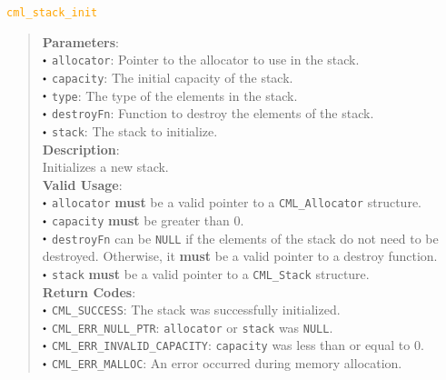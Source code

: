 \documentclass[a4paper,oneside,10pt]{article}
\newcommand{\macro}[1]{
  \noindent\textcolor{orange}{\texttt{#1}}
  \vspace{-0.3em}
}
\renewcommand{\dot}{\raisebox{0.3ex}{\scalebox{0.6}{$\bullet$}}}
\theoremstyle{definition}
\begin{document}
\macro{cml\_stack\_init}
\begin{quote}
  \textbf{Parameters}: \\
  $\dot$ \texttt{allocator}: Pointer to the allocator to use in the stack. \\
  $\dot$ \texttt{capacity}: The initial capacity of the stack. \\
  $\dot$ \texttt{type}: The type of the elements in the stack. \\
  $\dot$ \texttt{destroyFn}: Function to destroy the elements of the stack. \\
  $\dot$ \texttt{stack}: The stack to initialize. \\
  
  \vspace{-0.75em}
  \textbf{Description}: \\
  Initializes a new stack. \\

  \vspace{-0.75em}
  \textbf{Valid Usage}: \\
  $\dot$ \texttt{allocator} \textbf{must} be a valid pointer to a \texttt{CML\_Allocator} structure. \\
  $\dot$ \texttt{capacity} \textbf{must} be greater than 0. \\
  $\dot$ \texttt{destroyFn} can be \texttt{NULL} if the elements of the stack do not need to be destroyed. Otherwise, it \textbf{must} be a valid pointer to a destroy function. \\
  $\dot$ \texttt{stack} \textbf{must} be a valid pointer to a \texttt{CML\_Stack} structure. \\

  \vspace{-0.75em}
  \textbf{Return Codes}: \\
  $\dot$ \texttt{CML\_SUCCESS}: The stack was successfully initialized. \\
  $\dot$ \texttt{CML\_ERR\_NULL\_PTR}: \texttt{allocator} or \texttt{stack} was \texttt{NULL}. \\
  $\dot$ \texttt{CML\_ERR\_INVALID\_CAPACITY}: \texttt{capacity} was less than or equal to 0. \\
  $\dot$ \texttt{CML\_ERR\_MALLOC}: An error occurred during memory allocation. \\
\end{quote}
\end{document}
